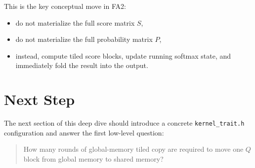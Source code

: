 \documentclass[11pt]{article}
\begin{document}
This is the key conceptual move in FA2:

\begin{itemize}
    \item do not materialize the full score matrix $S$,
    \item do not materialize the full probability matrix $P$,
    \item instead, compute tiled score blocks, update running softmax state,
    and immediately fold the result into the output.
\end{itemize}

\section{Next Step}

The next section of this deep dive should introduce a concrete
\texttt{kernel\_trait.h} configuration and answer the first low-level question:

\begin{quote}
How many rounds of global-memory tiled copy are required to move one
$Q$ block from global memory to shared memory?
\end{quote}
\end{document}
